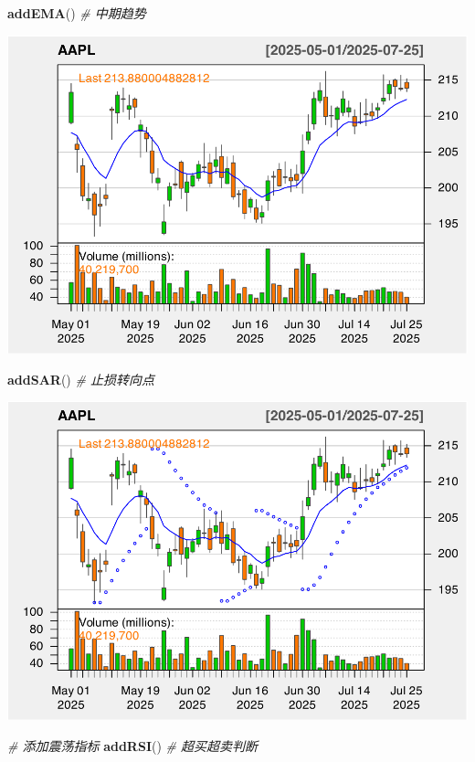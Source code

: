 \documentclass[]{ctexbook}
\newenvironment{Shaded}{\begin{snugshade}}{\end{snugshade}}
\newcommand{\CommentTok}[1]{\textcolor[rgb]{0.56,0.35,0.01}{\textit{#1}}}
\newcommand{\FunctionTok}[1]{\textcolor[rgb]{0.13,0.29,0.53}{\textbf{#1}}}
\newcommand{\NormalTok}[1]{#1}
\begin{document}
\begin{Shaded}
\begin{Highlighting}[]
\FunctionTok{addEMA}\NormalTok{()  }\CommentTok{\# 中期趋势}
\end{Highlighting}
\end{Shaded}

\includegraphics[width=0.9\linewidth]{QuantmodHandbook_files/figure-latex/comprehensive-3}

\begin{Shaded}
\begin{Highlighting}[]
\FunctionTok{addSAR}\NormalTok{()  }\CommentTok{\# 止损转向点}
\end{Highlighting}
\end{Shaded}

\includegraphics[width=0.9\linewidth]{QuantmodHandbook_files/figure-latex/comprehensive-4}

\begin{Shaded}
\begin{Highlighting}[]
\CommentTok{\# 添加震荡指标}
\FunctionTok{addRSI}\NormalTok{()  }\CommentTok{\# 超买超卖判断}
\end{Highlighting}
\end{Shaded}
\end{document}
